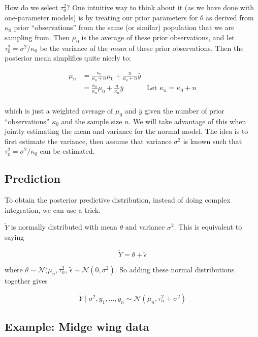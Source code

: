 \documentclass[]{article}
\begin{document}
How do we select \(\tau_0^2\)? One intuitive way to think about it (as
we have done with one-parameter models) is by treating our prior
parameters for \(\theta\) as derived from \(\kappa_0\) prior
``observations'' from the same (or similar) population that we are
sampling from. Then \(\mu_0\) is the average of these prior
observations, and let \(\tau_0^2 = \sigma^2 / \kappa_0\) be the variance
of the \emph{mean} of these prior observations. Then the posterior mean
simplifies quite nicely to:

\begin{align}
\mu_n &= \frac{\kappa_0}{\kappa_0 + n}\mu_0 + \frac{n}{\kappa_0 + n}\bar{y} \\
&= \frac{\kappa_0}{\kappa_n}\mu_0 + \frac{n}{\kappa_n}\bar{y} & \text{Let $\kappa_n = \kappa_0 + n$} \\
\end{align}

which is just a weighted average of \(\mu_0\) and \(\bar{y}\) given the
number of prior ``observations'' \(\kappa_0\) and the sample size \(n\).
We will take advantage of this when jointly estimating the mean and
variance for the normal model. The idea is to first estimate the
variance, then assume that variance \(\sigma^2\) is known such that
\(\tau_0^2 = \sigma^2 / \kappa_0\) can be estimated.

\hypertarget{prediction}{%
\subsection{Prediction}\label{prediction}}

To obtain the posterior predictive distribution, instead of doing
complex integration, we can use a trick.

\(\tilde{Y}\) is normally distributed with mean \(\theta\) and variance
\(\sigma^2\). This is equivalent to saying

\[\tilde{Y} = \theta + \tilde{\epsilon}\]

where \(\theta \sim \mathcal{N}(\mu_n, \tau_n^2\),
\(\tilde{\epsilon} \sim \mathcal{N}(0, \sigma^2)\). So adding these
normal distributions together gives

\[\tilde{Y} \mid \sigma^2, y_1, \dots, y_n \sim \mathcal{N}(\mu_n, \tau_n^2 + \sigma^2)\]

\hypertarget{example-midge-wing-data}{%
\subsection{Example: Midge wing data}\label{example-midge-wing-data}}
\end{document}
